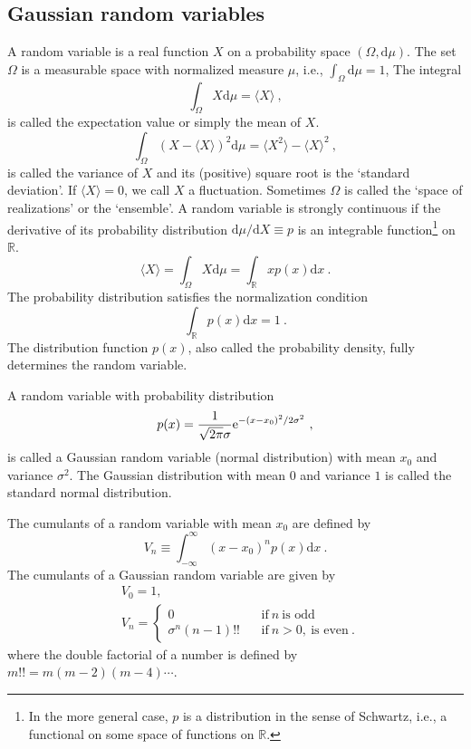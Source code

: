 \documentclass[12pt,a4paper]{article}
\newcommand{\dif}{\mathrm{d}}
\begin{document}
\subsection{Gaussian random variables}
\cite{2008cmb..book.....D} A random variable is a real function $X$ on a probability space $(\Omega, \dif \mu)$. The set $\Omega$ is a measurable space with normalized measure $\mu$, i.e., $\int_{\Omega} \dif \mu = 1$, The integral
\begin{equation}
\int_\Omega X \dif \mu = \langle X \rangle ~,
\end{equation}
is called the expectation value or simply the mean of $X$.
\begin{equation}
\int_\Omega (X-\langle X \rangle)^2 \dif \mu = \langle X^2 \rangle -\langle X \rangle^2 ~,
\end{equation}
is called the variance of $X$ and its (positive) square root is the `standard deviation'. If $\langle X \rangle = 0$, we call $X$ a fluctuation. Sometimes $\Omega$ is called the `space of realizations' or the `ensemble'. A random variable is strongly continuous if the derivative of its probability distribution $\dif \mu/\dif X \equiv p$ is an integrable function\footnote{In the more general case, $p$ is a distribution in the sense of Schwartz, i.e., a functional on some space of functions on $\mathbb{R}$.} on $\mathbb{R}$. 
\begin{equation}
\langle X \rangle = \int_\Omega X \dif \mu = \int_\mathbb{R} x p(x) \dif x ~.
\end{equation}
The probability distribution satisfies the normalization condition
\begin{equation}
\int_\mathbb{R} p(x) \dif x = 1 ~.
\end{equation}
The distribution function $p(x)$, also called the probability density, fully determines the random variable.

A random variable with probability distribution
\begin{equation}
p(x) = \dfrac{1}{\sqrt{2\pi} \sigma} {\rm e}^{-(x-x_0)^2/2\sigma^2} ~,
\end{equation}
is called a Gaussian random variable (normal distribution) with mean $x_0$ and variance $\sigma^2$. The Gaussian distribution with mean $0$ and variance $1$ is called the standard normal distribution.

The cumulants of a random variable with mean $x_0$ are defined by
\begin{equation}
V_n \equiv \int_{-\infty}^\infty (x-x_0)^n p(x) \dif x ~.
\end{equation}
The cumulants of a Gaussian random variable are given by
\begin{align}
& V_0 = 1, \\
& V_n = \left\{
\begin{aligned}
0 ~~~&~ \text{if} ~ n ~\text{is odd} \\
\sigma^n (n-1)!! ~~~&~ \text{if} ~ n > 0, ~\text{is even} ~.
\end{aligned}
\right.
\end{align}
where the double factorial of a number is defined by $m!! = m(m − 2)(m − 4) \cdots$.
\end{document}
